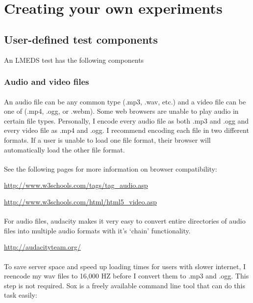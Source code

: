 
\section{Creating your own experiments}

\subsection{User-defined test components}

An LMEDS test has the following components


\subsubsection{Audio and video files}

\paragraph{}
An audio file can be any common type (.mp3, .wav, etc.) and a video file can be one of (.mp4, .ogg, or .webm).   Some web browsers are unable to play audio in certain file types.  Personally, I encode every audio file as both .mp3 and .ogg and every video file as .mp4 and .ogg.  I recommend encoding each file in two different formats.  If a user is unable to load one file format, their browser will automatically load the other file format.

\paragraph{}
See the following pages for more information on browser compatibility:

\url{http://www.w3schools.com/tags/tag\_audio.asp}

\url{http://www.w3schools.com/html/html5_video.asp}

\paragraph{}
For audio files, audacity makes it very easy to convert entire directories of audio files into multiple audio formats with it's `chain' functionality.  

\url{http://audacityteam.org/}

\paragraph{}
To save server space and speed up loading times for users with slower internet, I reencode my wav files to 16,000 HZ before I convert them to .mp3 and .ogg.  This step is not required.  Sox is a freely available command line tool that can do this task easily:

